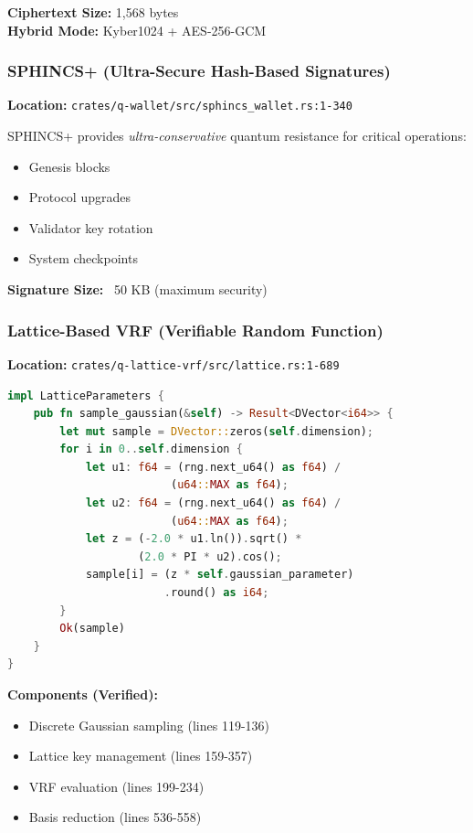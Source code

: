 \documentclass[11pt,a4paper]{article}
\begin{document}
\textbf{Ciphertext Size:} 1,568 bytes\\
\textbf{Hybrid Mode:} Kyber1024 + AES-256-GCM

\subsubsection{SPHINCS+ (Ultra-Secure Hash-Based Signatures)}

\textbf{Location:} \texttt{crates/q-wallet/src/sphincs\_wallet.rs:1-340}

SPHINCS+ provides \textit{ultra-conservative} quantum resistance for critical operations:

\begin{itemize}
    \item Genesis blocks
    \item Protocol upgrades
    \item Validator key rotation
    \item System checkpoints
\end{itemize}

\textbf{Signature Size:} ~50 KB (maximum security)

\subsubsection{Lattice-Based VRF (Verifiable Random Function)}

\textbf{Location:} \texttt{crates/q-lattice-vrf/src/lattice.rs:1-689}

\begin{lstlisting}[language=Rust,caption={Lattice VRF with Discrete Gaussian Sampling}]
impl LatticeParameters {
    pub fn sample_gaussian(&self) -> Result<DVector<i64>> {
        let mut sample = DVector::zeros(self.dimension);
        for i in 0..self.dimension {
            let u1: f64 = (rng.next_u64() as f64) /
                         (u64::MAX as f64);
            let u2: f64 = (rng.next_u64() as f64) /
                         (u64::MAX as f64);
            let z = (-2.0 * u1.ln()).sqrt() *
                    (2.0 * PI * u2).cos();
            sample[i] = (z * self.gaussian_parameter)
                        .round() as i64;
        }
        Ok(sample)
    }
}
\end{lstlisting}

\textbf{Components (Verified):}
\begin{itemize}
    \item Discrete Gaussian sampling (lines 119-136)
    \item Lattice key management (lines 159-357)
    \item VRF evaluation (lines 199-234)
    \item Basis reduction (lines 536-558)
\end{itemize}
\end{document}

